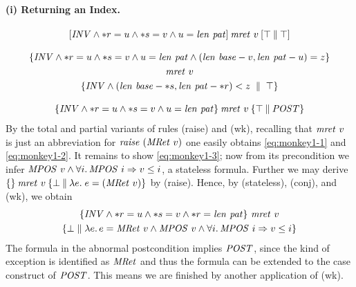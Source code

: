 \paragraph{(i) Returning an Index.} 
\begin{gather}
\label{eq:monkey1-1}
[\mathit{INV} \land {\ast r} = u \land {\ast s} = v
  \land u = \mathit{len}~\mathit{pat}]\:\mathit{mret}~v\:[\top\:\|\:\top]\\[2ex]\nonumber
\{\mathit{INV} \land {\ast r} = u \land {\ast s} = v \land u = \mathit{len}~\mathit{pat} \land
(\mathit{len}~\mathit{base}-v, \mathit{len}~\mathit{pat}-u) = z\} \\
\label{eq:monkey1-2}
  {\mathit{mret}~v}\\\nonumber
  \{\mathit{INV} \land (\mathit{len}~\mathit{base} - {\ast s}, 
    \mathit{len}~\mathit{pat}-{\ast r}) < z \;\parallel\; \top\}\\[2ex]
\label{eq:monkey1-3}
\{\mathit{INV} \land {\ast r} = u \land {\ast s} = v \land u = \mathit{len}~\mathit{pat}\}\:\mathit{mret}~v\:\{\top\:\|\:\mathit{POST}\}
\end{gather}
By the total and partial variants of rules (raise) and (wk), recalling that
$\mathit{mret}~v$ is just an abbreviation for $\mathit{raise}~(\mathit{MRet}~v)$ one easily
obtains \eqref{eq:monkey1-1} and \eqref{eq:monkey1-2}. It remains to show
\eqref{eq:monkey1-3}; now from its precondition we infer $\mathit{MPOS}\ v \land \forall i.\,
\mathit{MPOS}\ i \Rightarrow v \leq i$, a stateless formula.  Further we may derive
$\{\}\:\mathit{mret}~v\:\{\bot\:\|\:\lambda e.\; e = (\mathit{MRet}~v)\}$ by (raise). Hence, by
(stateless), (conj), and (wk), we obtain
\begin{multline*}
\{\mathit{INV}  \land {\ast r} = u \land {\ast s} = v \land {\ast r}
= \mathit{len}~\mathit{pat}\}\ \mathit{mret}~v\\
 \{\bot \parallel \lambda e.\, e = \mathit{MRet}\ v
\land \mathit{MPOS}\ v \land \forall i.\, \mathit{MPOS}\ i \Rightarrow v\leq i\}
\end{multline*}
The formula in the abnormal postcondition implies $\mathit{POST}$, since the
kind of exception  is identified as $\mathit{MRet}$ and thus the formula can be
extended to the case construct of
$\mathit{POST}$. This means we are finished by another application
of (wk).

